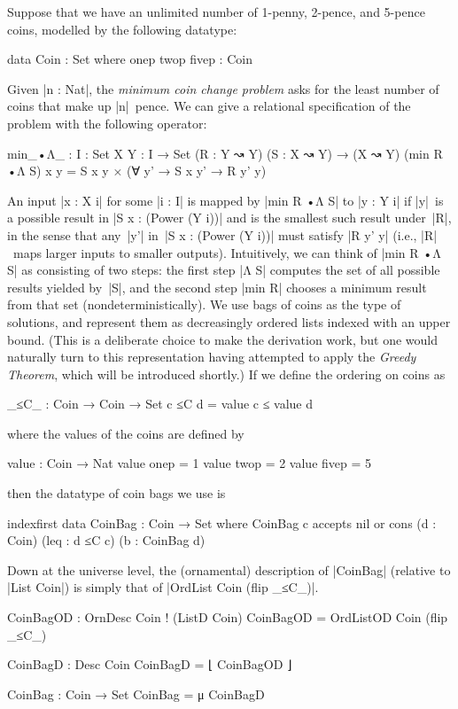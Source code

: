 Suppose that we have an unlimited number of 1-penny, 2-pence, and 5-pence coins, modelled by the following datatype:
\begin{code}
data Coin : Set where
  onep twop fivep : Coin
\end{code}
Given |n : Nat|, the \emph{minimum coin change problem} asks for the least number of coins that make up |n|~pence.
We can give a relational specification of the problem with the following operator:
\begin{code}
min_•Λ_ :  {I : Set} {X Y : I → Set}
           (R : Y ↝ Y) (S : X ↝ Y) → (X ↝ Y)
(min R •Λ S) x y = S x y × (∀ y' → S x y' → R y' y)
\end{code}
An input |x : X i| for some |i : I| is mapped by |min R •Λ S| to |y : Y i| if |y|~is a possible result in |S x : (Power (Y i))| and is the smallest such result under~|R|, in the sense that any~|y'| in~|S x : (Power (Y i))| must satisfy |R y' y| (i.e., |R|~maps larger inputs to smaller outputs).
Intuitively, we can think of |min R •Λ S| as consisting of two steps: the first step |Λ S| computes the set of all possible results yielded by~|S|, and the second step |min R| chooses a minimum result from that set (nondeterministically).
We use bags of coins as the type of solutions, and represent them as decreasingly ordered lists indexed with an upper bound.
(This is a deliberate choice to make the derivation work, but one would naturally turn to this representation having attempted to apply the \emph{Greedy Theorem}, which will be introduced shortly.)
If we define the ordering on coins as
\begin{code}
_≤C_ : Coin → Coin → Set
c ≤C d = value c ≤ value d
\end{code}
where the values of the coins are defined by
\begin{code}
value : Coin → Nat
value  onep   =  1
value  twop   =  2
value  fivep  =  5
\end{code}
then the datatype of coin bags we use is
\begin{code}
indexfirst data CoinBag : Coin → Set where
  CoinBag c  accepts  nil
             or       cons  (d : Coin) (leq : d ≤C c) (b : CoinBag d)
\end{code}
Down at the universe level, the (ornamental) description of |CoinBag| (relative to |List Coin|) is simply that of |OrdList Coin (flip _≤C_)|.
\begin{code}
CoinBagOD : OrnDesc Coin ! (ListD Coin)
CoinBagOD = OrdListOD Coin (flip _≤C_)

CoinBagD : Desc Coin
CoinBagD = ⌊ CoinBagOD ⌋

CoinBag : Coin → Set
CoinBag = μ CoinBagD
\end{code}
